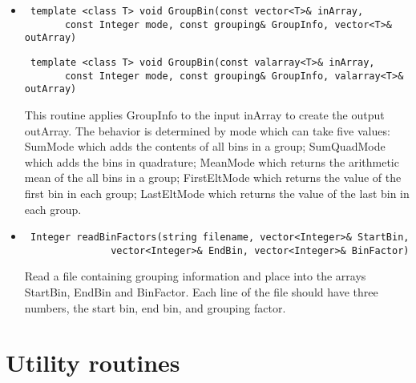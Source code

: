 \documentclass[11pt]{book}
\begin{document}
\begin{itemize}

\item  \begin{verbatim} template <class T> void GroupBin(const vector<T>& inArray, 
       const Integer mode, const grouping& GroupInfo, vector<T>& outArray) \end{verbatim}
       \begin{verbatim} template <class T> void GroupBin(const valarray<T>& inArray, 
       const Integer mode, const grouping& GroupInfo, valarray<T>& outArray) \end{verbatim}

          This routine applies GroupInfo to the input inArray to
          create the output outArray. The behavior is determined by
          mode which can take five values: SumMode which adds the
          contents of all bins in a group; SumQuadMode which adds the
          bins in quadrature; MeanMode which returns the arithmetic
          mean of the all bins in a group; FirstEltMode which returns
          the value of the first bin in each group; LastEltMode which
          returns the value of the last bin in each group.

\item  \begin{verbatim} Integer readBinFactors(string filename, vector<Integer>& StartBin, 
               vector<Integer>& EndBin, vector<Integer>& BinFactor) \end{verbatim}

          Read a file containing grouping information and place into
          the arrays StartBin, EndBin and BinFactor. Each line of
          the file should have three numbers, the start bin, end bin, and
          grouping factor.

\end{itemize}

\section{Utility routines}
\end{document}
